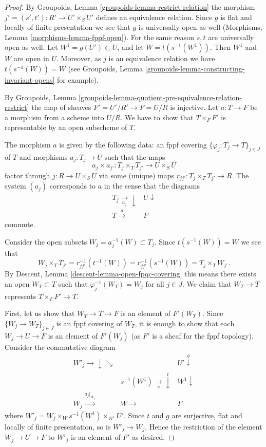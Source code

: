 \begin{proof}
By Groupoids, Lemma \ref{groupoids-lemma-restrict-relation}
the morphism $j' = (s', t') : R' \to U' \times_S U'$
defines an equivalence relation. Since $g$ is flat and locally of
finite presentation we see that $g$ is universally open as well
(Morphisms, Lemma \ref{morphisms-lemma-fppf-open}).
For the same reason $s, t$ are universally open as well.
Let $W^1 = g(U') \subset U$, and let $W = t(s^{-1}(W^1))$.
Then $W^1$ and $W$ are open in $U$. Moreover, as $j$ is an
equivalence relation we have $t(s^{-1}(W)) = W$ (see
Groupoids, Lemma \ref{groupoids-lemma-constructing-invariant-opens}
for example).

\medskip\noindent
By
Groupoids,
Lemma \ref{groupoids-lemma-quotient-pre-equivalence-relation-restrict}
the map of sheaves $F' = U'/R' \to F = U/R$ is injective.
Let $a : T \to F$ be a morphism from a scheme into $U/R$.
We have to show that $T \times_F F'$ is representable
by an open subscheme of $T$.

\medskip\noindent
The morphism $a$ is given by the following data:
an fppf covering $\{\varphi_j : T_j \to T\}_{j \in J}$ of $T$ and
morphisms $a_j : T_j \to U$ such that the maps
$$
a_j \times a_{j'} :
T_j \times_T T_{j'}
\longrightarrow
U \times_S U
$$
factor through $j : R \to U \times_S U$ via some (unique) maps
$r_{jj'} : T_j \times_T T_{j'} \to R$. The system
$(a_j)$ corresponds to $a$ in the sense that the diagrams
$$
\begin{array}{cc}T_j \underset{a_j}{\longrightarrow}\downarrow & U \downarrow \\ T \overset{a}{\longrightarrow} & F\end{array}
$$
commute.

\medskip\noindent
Consider the open subsets $W_j = a_j^{-1}(W) \subset T_j$.
Since $t(s^{-1}(W)) = W$ we see that
$$
W_j \times_T T_{j'} =
r_{jj'}^{-1}(t^{-1}(W)) = r_{jj'}^{-1}(s^{-1}(W)) =
T_j \times_T W_{j'}.
$$
By
Descent, Lemma \ref{descent-lemma-open-fpqc-covering}
this means there exists an open
$W_T \subset T$ such that $\varphi_j^{-1}(W_T) = W_j$ for all $j \in J$.
We claim that $W_T \to T$ represents $T \times_F F' \to T$.

\medskip\noindent
First, let us show that $W_T \to T \to F$ is an element of
$F'(W_T)$. Since $\{W_j \to W_T\}_{j \in J}$ is an
fppf covering of $W_T$, it is enough to show that
each $W_j \to U \to F$ is an element of $F'(W_j)$ (as $F'$ is a sheaf
for the fppf topology). Consider the commutative diagram
$$
\begin{array}{ccc}W'_j \longrightarrow\downarrow\searrow &  & U' \overset{g}{\downarrow} \\  & s^{-1}(W^1) \underset{s}{\longrightarrow}\overset{t}{\downarrow} & W^1 \downarrow \\ W_j \overset{a_j|_{W_j}}{\longrightarrow} & W \longrightarrow & F\end{array}
$$
where $W'_j = W_j \times_W s^{-1}(W^1) \times_{W^1} U'$.
Since $t$ and $g$ are surjective, flat and locally of finite
presentation, so is $W'_j \to W_j$. Hence the restriction of
the element $W_j \to U \to F$ to $W'_j$ is an element of $F'$
as desired.


\end{proof}
